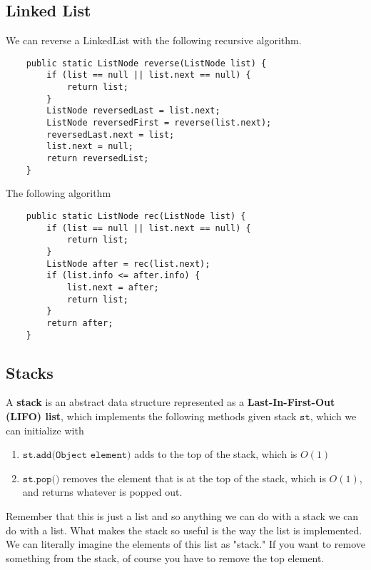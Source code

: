\subsection{Linked List}

  \begin{example}[Reverse]
    We can reverse a LinkedList with the following recursive algorithm. 
    \begin{lstlisting}
    public static ListNode reverse(ListNode list) {
        if (list == null || list.next == null) {
            return list; 
        }
        ListNode reversedLast = list.next; 
        ListNode reversedFirst = reverse(list.next); 
        reversedLast.next = list; 
        list.next = null; 
        return reversedList; 
    }
    \end{lstlisting}
  \end{example}

  \begin{example}
    The following algorithm 
    \begin{lstlisting}
    public static ListNode rec(ListNode list) {
        if (list == null || list.next == null) {
            return list; 
        }
        ListNode after = rec(list.next); 
        if (list.info <= after.info) {
            list.next = after; 
            return list; 
        }
        return after; 
    }
    \end{lstlisting}
  \end{example}

\subsection{Stacks}

  \begin{definition}[Stack]
    A \textbf{stack} is an abstract data structure represented as a \textbf{Last-In-First-Out (LIFO) list}, which implements the following methods given stack $\texttt{st}$, which we can initialize with 
    \begin{enumerate}
      \item $\texttt{st.add(Object element)}$ adds to the top of the stack, which is $O(1)$ 
      \item $\texttt{st.pop()}$ removes the element that is at the top of the stack, which is $O(1)$, and returns whatever is popped out. 
    \end{enumerate}
    Remember that this is just a list and so anything we can do with a stack we can do with a list. What makes the stack so useful is the way the list is implemented. We can literally imagine the elements of this list as "stack." If you want to remove something from the stack, of course you have to remove the top element. 
  \end{definition}

